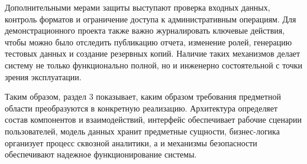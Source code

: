 Дополнительными мерами защиты выступают проверка входных данных, контроль форматов и ограничение доступа к административным операциям. Для демонстрационного проекта также важно журналировать ключевые действия, чтобы можно было отследить публикацию отчета, изменение ролей, генерацию тестовых данных и создание резервных копий. Наличие таких механизмов делает систему не только функционально полной, но и инженерно состоятельной с точки зрения эксплуатации.

Таким образом, раздел 3 показывает, каким образом требования предметной области преобразуются в конкретную реализацию. Архитектура определяет состав компонентов и взаимодействий, интерфейс обеспечивает рабочие сценарии пользователей, модель данных хранит предметные сущности, бизнес-логика организует процесс сквозной аналитики, а  и механизмы безопасности обеспечивают надежное функционирование системы.
